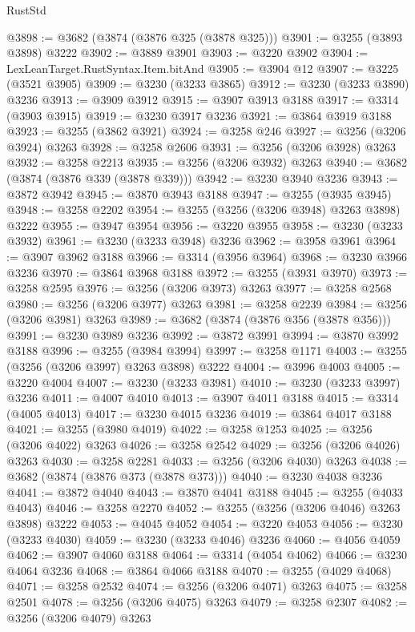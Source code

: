\begin{lexlean}{RustStd}
\begin{coremodule}
@3898 := @3682 (@3874 (@3876 @325 (@3878 @325)))
@3901 := @3255 (@3893 @3898) @3222
@3902 := @3889 @3901
@3903 := @3220 @3902
@3904 := LexLeanTarget.RustSyntax.Item.bitAnd
@3905 := @3904 @12
@3907 := @3225 (@3521 @3905)
@3909 := @3230 (@3233 @3865)
@3912 := @3230 (@3233 @3890) @3236
@3913 := @3909 @3912
@3915 := @3907 @3913 @3188
@3917 := @3314 (@3903 @3915)
@3919 := @3230 @3917 @3236
@3921 := @3864 @3919 @3188
@3923 := @3255 (@3862 @3921)
@3924 := @3258 @246
@3927 := @3256 (@3206 @3924) @3263
@3928 := @3258 @2606
@3931 := @3256 (@3206 @3928) @3263
@3932 := @3258 @2213
@3935 := @3256 (@3206 @3932) @3263
@3940 := @3682 (@3874 (@3876 @339 (@3878 @339)))
@3942 := @3230 @3940 @3236
@3943 := @3872 @3942
@3945 := @3870 @3943 @3188
@3947 := @3255 (@3935 @3945)
@3948 := @3258 @2202
@3954 := @3255 (@3256 (@3206 @3948) @3263 @3898) @3222
@3955 := @3947 @3954
@3956 := @3220 @3955
@3958 := @3230 (@3233 @3932)
@3961 := @3230 (@3233 @3948) @3236
@3962 := @3958 @3961
@3964 := @3907 @3962 @3188
@3966 := @3314 (@3956 @3964)
@3968 := @3230 @3966 @3236
@3970 := @3864 @3968 @3188
@3972 := @3255 (@3931 @3970)
@3973 := @3258 @2595
@3976 := @3256 (@3206 @3973) @3263
@3977 := @3258 @2568
@3980 := @3256 (@3206 @3977) @3263
@3981 := @3258 @2239
@3984 := @3256 (@3206 @3981) @3263
@3989 := @3682 (@3874 (@3876 @356 (@3878 @356)))
@3991 := @3230 @3989 @3236
@3992 := @3872 @3991
@3994 := @3870 @3992 @3188
@3996 := @3255 (@3984 @3994)
@3997 := @3258 @1171
@4003 := @3255 (@3256 (@3206 @3997) @3263 @3898) @3222
@4004 := @3996 @4003
@4005 := @3220 @4004
@4007 := @3230 (@3233 @3981)
@4010 := @3230 (@3233 @3997) @3236
@4011 := @4007 @4010
@4013 := @3907 @4011 @3188
@4015 := @3314 (@4005 @4013)
@4017 := @3230 @4015 @3236
@4019 := @3864 @4017 @3188
@4021 := @3255 (@3980 @4019)
@4022 := @3258 @1253
@4025 := @3256 (@3206 @4022) @3263
@4026 := @3258 @2542
@4029 := @3256 (@3206 @4026) @3263
@4030 := @3258 @2281
@4033 := @3256 (@3206 @4030) @3263
@4038 := @3682 (@3874 (@3876 @373 (@3878 @373)))
@4040 := @3230 @4038 @3236
@4041 := @3872 @4040
@4043 := @3870 @4041 @3188
@4045 := @3255 (@4033 @4043)
@4046 := @3258 @2270
@4052 := @3255 (@3256 (@3206 @4046) @3263 @3898) @3222
@4053 := @4045 @4052
@4054 := @3220 @4053
@4056 := @3230 (@3233 @4030)
@4059 := @3230 (@3233 @4046) @3236
@4060 := @4056 @4059
@4062 := @3907 @4060 @3188
@4064 := @3314 (@4054 @4062)
@4066 := @3230 @4064 @3236
@4068 := @3864 @4066 @3188
@4070 := @3255 (@4029 @4068)
@4071 := @3258 @2532
@4074 := @3256 (@3206 @4071) @3263
@4075 := @3258 @2501
@4078 := @3256 (@3206 @4075) @3263
@4079 := @3258 @2307
@4082 := @3256 (@3206 @4079) @3263

\end{coremodule}
\end{lexlean}
